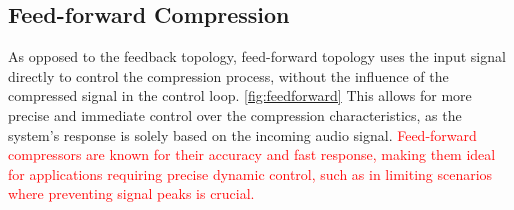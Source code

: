\documentclass[10pt]{article}
\begin{document}
\begin{multicols*}{2}
\begin{minipage}{\linewidth}
                        \label{fig:feedback}
                    
                    \end{minipage}
                
            \subsection{Feed-forward Compression}
                As opposed to the feedback topology, feed-forward topology uses the input signal directly to control the compression process, without the influence of the compressed signal in the control loop. \ref{fig:feedforward} This allows for more precise and immediate control over the compression characteristics, as the system's response is solely based on the incoming audio signal. \textcolor{red}{Feed-forward compressors are known for their accuracy and fast response, making them ideal for applications requiring precise dynamic control, such as in limiting scenarios where preventing signal peaks is crucial.}\par

                    \noindent
                    \begin{minipage}{\linewidth}

                        \centering

\end{minipage}
\end{multicols*}
\end{document}
